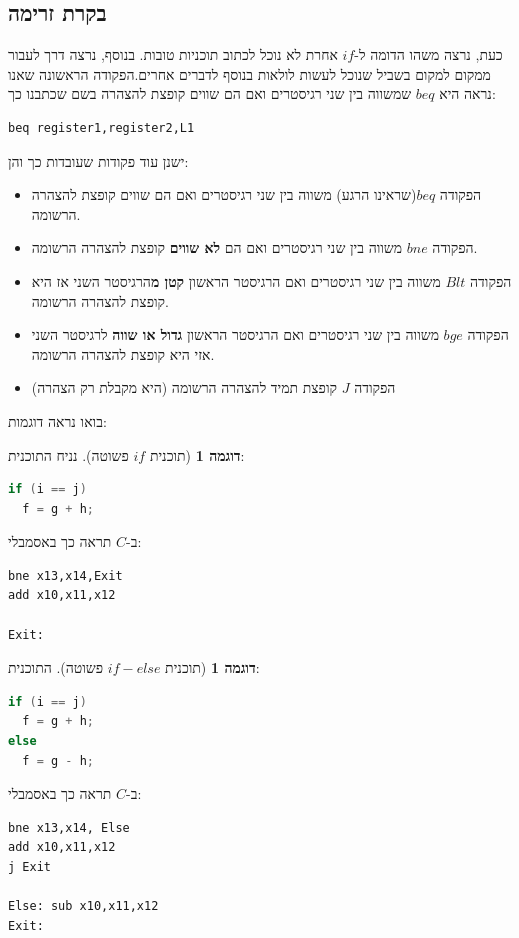 \documentclass[12pt]{article}
\theoremstyle{plain}
\theoremstyle{definition}
\newtheorem{example}[theorem]{דוגמה}      %
\theoremstyle{remark}
\begin{document}
\subsection{בקרת זרימה}
כעת, נרצה משהו הדומה ל-\({if}\) אחרת לא נוכל לכתוב תוכניות טובות. בנוסף, נרצה דרך לעבור ממקום למקום בשביל שנוכל לעשות לולאות בנוסף לדברים אחרים.הפקודה הראשונה שאנו נראה היא \({beq}\) שמשווה בין שני רגיסטרים ואם הם שווים קופצת להצהרה בשם שכתבנו כך:\begin{LTR}\begin{lstlisting}[language=assembly]
beq register1,register2,L1

\end{lstlisting}\end{LTR}ישנן עוד פקודות שעובדות כך והן:\begin{itemize}
\item הפקודה \({beq}\)(שראינו הרגע) משווה בין שני רגיסטרים ואם הם שווים קופצת להצהרה הרשומה.
\item הפקודה \({bne}\) משווה בין שני רגיסטרים ואם הם \textbf{לא שווים} קופצת להצהרה הרשומה.
\item הפקודה \({Blt}\) משווה בין שני רגיסטרים ואם הרגיסטר הראשון \textbf{קטן מ}הרגיסטר השני אז היא קופצת להצהרה הרשומה.
\item הפקודה \({bge}\) משווה בין שני רגיסטרים ואם הרגיסטר הראשון \textbf{גדול או שווה} לרגיסטר השני אזי היא קופצת להצהרה הרשומה.
\item הפקודה \({J}\) קופצת תמיד להצהרה הרשומה (היא מקבלת רק הצהרה)
\end{itemize}
בואו נראה דוגמות:\begin{example}[תוכנית \(if\) פשוטה]
נניח התוכנית:\begin{LTR}\begin{lstlisting}[language=c]
if (i == j)
  f = g + h;

\end{lstlisting}\end{LTR}ב-\({C}\) תראה כך באסמבלי:\begin{LTR}\begin{lstlisting}[language=assembly]
bne x13,x14,Exit
add x10,x11,x12

Exit:

\end{lstlisting}\end{LTR}
\end{example}
\begin{example}[תוכנית \(if-else\) פשוטה]
התוכנית:\begin{LTR}\begin{lstlisting}[language=c]
if (i == j)
  f = g + h;
else 
  f = g - h;

\end{lstlisting}\end{LTR}ב-\({C}\) תראה כך באסמבלי:\begin{LTR}\begin{lstlisting}[language=assembly]
bne x13,x14, Else
add x10,x11,x12
j Exit

Else: sub x10,x11,x12
Exit:

\end{lstlisting}\end{LTR}
\end{example}
\end{document}
